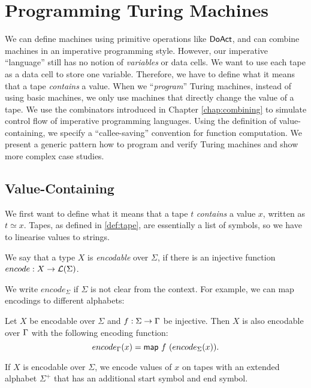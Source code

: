 \chapter{Programming Turing Machines}
\label{chap:programming}

We can define machines using primitive operations like $\textsf{DoAct}$, and can combine machines in an imperative programming style.  However, our
imperative ``language'' still has no notion of \emph{variables} or data cells.  We want to use each tape as a data cell to store one variable.
Therefore, we have to define what it means that a tape \emph{contains} a value.  When we ``\emph{program}'' Turing machines, instead of using basic
machines, we only use machines that directly change the value of a tape.  We use the combinators introduced in Chapter \ref{chap:combining} to
simulate control flow of imperative programming languages.  Using the definition of value-containing, we specify a ``callee-saving'' convention for
function computation.  We present a generic pattern how to program and verify Turing machines and show more complex case studies.


\section{Value-Containing}
\label{sec:value-containing}

We first want to define what it means that a tape $t$ \emph{contains} a value $x$, written as $t \simeq x$.  Tapes, as defined in \ref{def:tape}, are
essentially a list of symbols, so we have to linearise values to strings.

\begin{definition}
  We say that a type $X$ is \emph{encodable} over $\Sigma$, if there is an injective function $encode : X \rightarrow \mathcal{L}(\Sigma)$.
\end{definition}

We write $encode_\Sigma$ if $\Sigma$ is not clear from the context.  For example, we can map encodings to different alphabets:

\begin{definition}
  Let $X$ be encodable over $\Sigma$ and $f : \Sigma \rightarrow \Gamma$ be injective.  Then $X$ is also encodable over $\Gamma$ with the following encoding
  function:
  \[ encode_\Gamma(x) = \textsf{map}~f~(encode_\Sigma(x)). \]
\end{definition}


If $X$ is encodable over $\Sigma$, we encode values of $x$ on tapes with an extended alphabet $\Sigma^+$ that has an additional start symbol and end
symbol.

